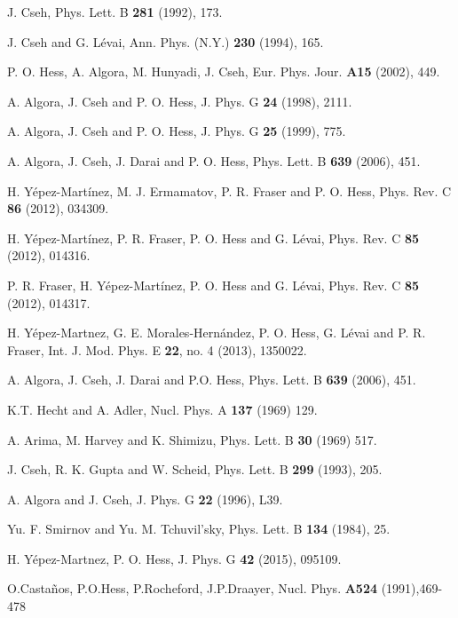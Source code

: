 \documentclass[12pt]{article}
\begin{document}
\begin{thebibliography}{99}

 J. Cseh, Phys. Lett. B \textbf{281} (1992), 173.

 J. Cseh and G. L\'evai, Ann. Phys. (N.Y.) \textbf{230}
(1994), 165.

 P. O. Hess, A. Algora, M. Hunyadi, J. Cseh,  Eur. Phys. Jour. {\bf A15} (2002), 449.

 A. Algora, J. Cseh and P. O. Hess,
J. Phys. G {\bf 24} (1998), 2111.

 A. Algora, J. Cseh and P. O. Hess,
J. Phys. G {\bf 25} (1999), 775.

 A. Algora, J. Cseh, J. Darai and 
P. O. Hess, Phys. Lett. B {\bf 639} (2006), 451.

 H. Y\'epez-Mart\'inez, M. J. Ermamatov, P. R. Fraser and P. O. Hess, 
Phys. Rev. C {\bf 86} (2012), 034309.

 H. Y\'epez-Mart\'inez, P. R. Fraser, P. O. Hess and
G. L\'evai, Phys. Rev. C {\bf 85} (2012), 014316.

 P. R. Fraser, H. Y\'epez-Mart\'inez, P. O. Hess and
G. L\'evai, Phys. Rev. C {\bf 85} (2012), 014317.

 H. Y\'epez-Mart\ii nez, G. E. Morales-Hern\'andez, P. O. Hess, G. L\'evai and P. R. Fraser,
Int. J. Mod. Phys. E {\bf 22}, no. 4 (2013), 1350022.

 A. Algora, J. Cseh, J. Darai and P.O. Hess, Phys. Lett. B {\bf 639} (2006), 451. 

 K.T. Hecht and A. Adler, Nucl. Phys. 
A {\bf 137} (1969) 129.

 A. Arima, M. Harvey and K. Shimizu, Phys. Lett. B {\bf 30} (1969) 517.

 J. Cseh, R. K. Gupta and W. Scheid,
Phys. Lett. B {\bf 299} (1993), 205.

 A. Algora and J. Cseh, J. Phys. G
{\bf 22} (1996), L39.

 Yu. F. Smirnov and Yu. M. Tchuvil'sky, Phys. Lett. B {\bf 134} (1984), 25.

 H. Y\'epez-Mart\ii nez, P. O. Hess, 
J. Phys. G {\bf 42} (2015), 095109.

 O.Casta\~nos, P.O.Hess, P.Rocheford, J.P.Draayer, Nucl. Phys. {\bf A524} (1991),469-478


\end{thebibliography}
\end{document}
